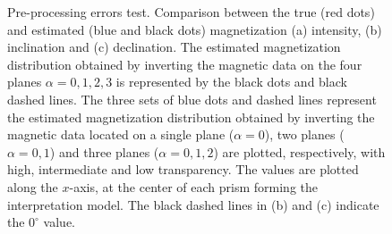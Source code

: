 \documentclass[draft,gc]{agutex}
\begin{document}
\begin{figure}
 \caption{Pre-processing errors test. Comparison between the true (red dots)
 and estimated (blue and black dots) magnetization 
 (a) intensity, (b) inclination and (c) declination.
 The estimated magnetization distribution obtained by 
 inverting the magnetic data on the four planes $\alpha = 0, 1, 2, 3$
 is represented
 by the black dots and black dashed lines. The three sets of
 blue dots and dashed lines represent the estimated 
 magnetization distribution obtained by inverting the 
 magnetic data located on a single plane ($\alpha = 0$),
 two planes ($\alpha = 0, 1$) and three planes ($\alpha = 0, 1, 2$)
 are plotted, respectively, with high, intermediate and low 
 transparency.
 The values are plotted along the $x$-axis, at the center of each 
 prism forming the interpretation model.
 The black dashed lines in (b) and (c) indicate the $0^{\circ}$ value.}
 \label{fig:estimate-pre-processing}
 \end{figure}
\end{document}
